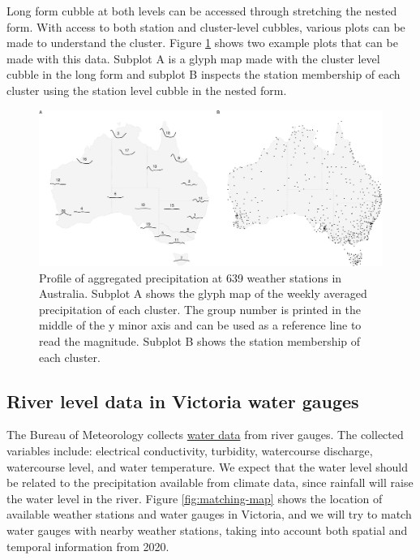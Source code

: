 \documentclass[
]{jss}
\begin{document}
Long form cubble at both levels can be accessed through stretching the nested form. With access to both station and cluster-level cubbles, various plots can be made to understand the cluster. Figure \ref{fig:basic-agg} shows two example plots that can be made with this data. Subplot A is a glyph map made with the cluster level cubble in the long form and subplot B inspects the station membership of each cluster using the station level cubble in the nested form.

\begin{CodeChunk}
\begin{figure}

{\centering \includegraphics{figures/basic-agg-1} 

}

\caption[Profile of aggregated precipitation at 639 weather stations in Australia]{Profile of aggregated precipitation at 639 weather stations in Australia. Subplot A shows the glyph map of the weekly averaged precipitation of each cluster. The group number is printed in the middle of the y minor axis and can be used as a reference line to read the magnitude. Subplot B shows the station membership of each cluster.}\label{fig:basic-agg}
\end{figure}
\end{CodeChunk}

\hypertarget{river-level-data-in-victoria-water-gauges}{%
\subsection{River level data in Victoria water gauges}\label{river-level-data-in-victoria-water-gauges}}

The Bureau of Meteorology collects \href{http://www.bom.gov.au/metadata/catalogue/19115/ANZCW0503900528?template=full}{water data} from river gauges. The collected variables include: electrical conductivity, turbidity, watercourse discharge, watercourse level, and water temperature. We expect that the water level should be related to the precipitation available from climate data, since rainfall will raise the water level in the river. Figure \ref{fig:matching-map} shows the location of available weather stations and water gauges in Victoria, and we will try to match water gauges with nearby weather stations, taking into account both spatial and temporal information from 2020.
\end{document}
